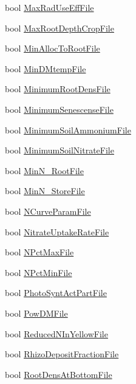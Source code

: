\begin{DoxyCompactItemize}
bool \hyperlink{classcrop_parameters_crop_a384de1a22cb7533a0df86b231ea2db00}{MaxRadUseEffFile}
\item 
bool \hyperlink{classcrop_parameters_crop_a785761588d18f6d0f1cea1e2123def70}{MaxRootDepthCropFile}
\item 
bool \hyperlink{classcrop_parameters_crop_a23bc88399bf8e22dfc976b6f9361cb2e}{MinAllocToRootFile}
\item 
bool \hyperlink{classcrop_parameters_crop_a4726dbd4a1384c21485ae3632efef99c}{MinDMtempFile}
\item 
bool \hyperlink{classcrop_parameters_crop_aafa02d07a576a1d37ceacb532f90d139}{MinimumRootDensFile}
\item 
bool \hyperlink{classcrop_parameters_crop_ac409dcbf4ba4ba24bf6b403ef0999b9a}{MinimumSenescenseFile}
\item 
bool \hyperlink{classcrop_parameters_crop_a2efa0ef5e2b857bcbd2258934889a5fe}{MinimumSoilAmmoniumFile}
\item 
bool \hyperlink{classcrop_parameters_crop_ae015d89d2d348ecc13570ec1d1c4a23d}{MinimumSoilNitrateFile}
\item 
bool \hyperlink{classcrop_parameters_crop_a04c7c774c0ea60744442a95e8df40be8}{MinN\_\-RootFile}
\item 
bool \hyperlink{classcrop_parameters_crop_a629ee464fe58718dda90182d2deebb9b}{MinN\_\-StoreFile}
\item 
bool \hyperlink{classcrop_parameters_crop_ac5733307bbef34b306c204b649922529}{NCurveParamFile}
\item 
bool \hyperlink{classcrop_parameters_crop_a4eee34a975dfc649c264c257f0fafc13}{NitrateUptakeRateFile}
\item 
bool \hyperlink{classcrop_parameters_crop_a79faba6653a4cfbe197df22c9fedfe14}{NPctMaxFile}
\item 
bool \hyperlink{classcrop_parameters_crop_a2191f7a4e06990ea9d30adfe418d8b70}{NPctMinFile}
\item 
bool \hyperlink{classcrop_parameters_crop_a24a66ac944b4af09d6766d25a417c45e}{PhotoSyntActPartFile}
\item 
bool \hyperlink{classcrop_parameters_crop_a881106679ca79b75ba884e34f92afcfb}{PowDMFile}
\item 
bool \hyperlink{classcrop_parameters_crop_a68cec7780f6c9cf5cc749887cef4ad71}{ReducedNInYellowFile}
\item 
bool \hyperlink{classcrop_parameters_crop_aa2d97c942491a7ff2ebd2c3d4476375f}{RhizoDepositFractionFile}
\item 
bool \hyperlink{classcrop_parameters_crop_a6bb945ded0c54265e7e05db2b4595c78}{RootDensAtBottomFile}

\end{DoxyCompactItemize}
